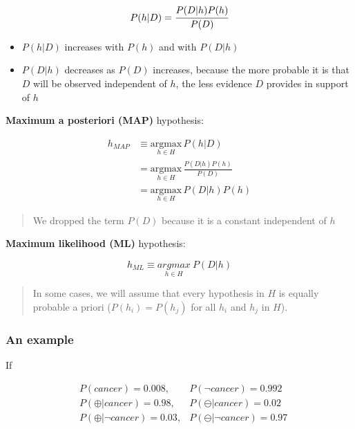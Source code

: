 \[P(h|D)=\cfrac{P(D|h)P(h)}{P(D)}\]

\begin{itemize}
\item
  \(P(h|D)\) increases with \(P(h)\) and with \(P(D|h)\)
\item
  \(P(D|h)\) decreases as \(P(D)\) increases, because the more probable
  it is that \(D\) will be observed independent of \(h\), the less
  evidence \(D\) provides in support of \(h\)
\end{itemize}

\textbf{Maximum a posteriori (MAP)} hypothesis:

\begin{equation*}
  \begin{aligned}
  h_{MAP} &\equiv \underset{h\in H}{\text{argmax}} \, P(h|D) \\
  &= \underset{h\in H}{\text{argmax}} \, \frac{P(D|h)P(h)}{P(D)} \\
  &= \underset{h\in H}{\text{argmax}} \, P(D|h)P(h)
\end{aligned}
\end{equation*}

\begin{quote}
We dropped the term \(P(D)\) because it is a constant independent of
\(h\)
\end{quote}

\textbf{Maximum likelihood (ML)} hypothesis:

\[h_{ML}\equiv \underset{h\in H}{argmax}\ P(D|h)\]

\begin{quote}
In some cases, we will assume that every hypothesis in \(H\) is equally
probable a priori (\(P(h_i)=P(h_j)\) for all \(h_i\) and \(h_j\) in
\(H\)).
\end{quote}

\hypertarget{an-example}{%
\subsubsection{An example}\label{an-example}}

If

\begin{equation*}
\begin{aligned}
&P(cancer)=0.008, &P(\neg cancer)=0.992\\
&P(\oplus |cancer)=0.98, &P(\ominus|cancer)=0.02\\
&P(\oplus|\neg cancer)=0.03, &P(\ominus|\neg cancer)=0.97
\end{aligned}
\end{equation*}

